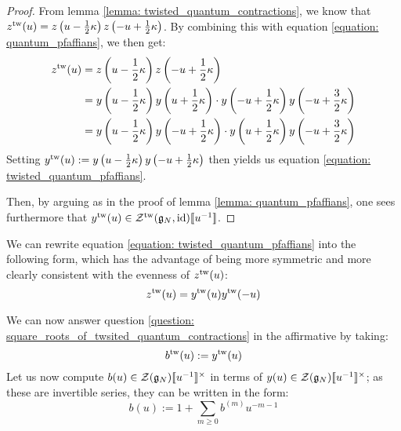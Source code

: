            \begin{proof}
                From lemma \ref{lemma: twisted_quantum_contractions}, we know that $z^{\mathrm{tw}}(u) = z\left( u - \frac12 \kappa \right) z\left( -u + \frac12 \kappa \right)$. By combining this with equation \eqref{equation: quantum_pfaffians}, we then get:
                    $$
                        \begin{aligned}
                            z^{\mathrm{tw}}(u) & = z\left( u - \frac12 \kappa \right) z\left( -u + \frac12 \kappa \right)
                            \\
                            & = y\left( u - \frac12 \kappa \right) y\left( u + \frac12 \kappa \right) \cdot y\left( -u + \frac12 \kappa \right) y\left( -u + \frac32 \kappa \right)
                            \\
                            & = y\left( u - \frac12 \kappa \right) y\left( -u + \frac12 \kappa \right) \cdot y\left( u + \frac12 \kappa \right) y\left( -u + \frac32 \kappa \right)
                        \end{aligned}
                    $$
                Setting $y^{\mathrm{tw}}(u) := y\left( u - \frac12 \kappa \right) y\left( -u + \frac12 \kappa \right)$ then yields us equation \eqref{equation: twisted_quantum_pfaffians}.

                Then, by arguing as in the proof of lemma \ref{lemma: quantum_pfaffians}, one sees furthermore that $y^{\mathrm{tw}}(u) \in \mathcal{Z}^{\mathrm{tw}}(\mathfrak{g}_N, \mathrm{id})[\![u^{-1}]\!]$.
            \end{proof}
        \begin{remark}
            We can rewrite equation \eqref{equation: twisted_quantum_pfaffians} into the following form, which has the advantage of being more symmetric and more clearly consistent with the evenness of $z^{\mathrm{tw}}(u)$:
                \begin{equation} \label{equation: symmetrised_twisted_quantum_pfaffians}
                    z^{\mathrm{tw}}(u) = y^{\mathrm{tw}}(u) y^{\mathrm{tw}}(-u)
                \end{equation}
        \end{remark}
        We can now answer question \ref{question: square_roots_of_twsited_quantum_contractions} in the affirmative by taking:
            $$b^{\mathrm{tw}}(u) := y^{\mathrm{tw}}(u)$$
        Let us now compute $b(u) \in \calZ(\g_N)[\![u^{-1}]\!]^{\x}$ in terms of $y(u) \in \calZ(\g_N)[\![u^{-1}]\!]^{\x}$; as these are invertible series, they can be written in the form:
            $$b(u) := 1 + \sum_{m \geq 0} b^{(m)} u^{-m - 1}$$
